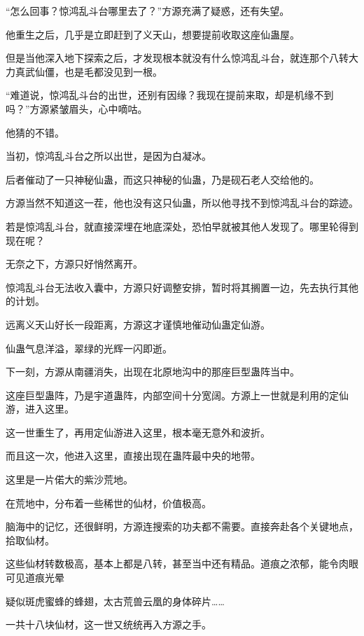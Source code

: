 
\begin{this_body}



“怎么回事？惊鸿乱斗台哪里去了？”方源充满了疑惑，还有失望。

他重生之后，几乎是立即赶到了义天山，想要提前收取这座仙蛊屋。

但是当他深入地下探索之后，才发现根本就没有什么惊鸿乱斗台，就连那个八转大力真武仙僵，也是毛都没见到一根。

“难道说，惊鸿乱斗台的出世，还别有因缘？我现在提前来取，却是机缘不到吗？”方源紧皱眉头，心中嘀咕。

他猜的不错。

当初，惊鸿乱斗台之所以出世，是因为白凝冰。

后者催动了一只神秘仙蛊，而这只神秘的仙蛊，乃是砚石老人交给他的。

方源当然不知道这一茬，他也没有这只仙蛊，所以他寻找不到惊鸿乱斗台的踪迹。

若是惊鸿乱斗台，就直接深埋在地底深处，恐怕早就被其他人发现了。哪里轮得到现在呢？

无奈之下，方源只好悄然离开。

惊鸿乱斗台无法收入囊中，方源只好调整安排，暂时将其搁置一边，先去执行其他的计划。

远离义天山好长一段距离，方源这才谨慎地催动仙蛊定仙游。

仙蛊气息洋溢，翠绿的光辉一闪即逝。

下一刻，方源从南疆消失，出现在北原地沟中的那座巨型蛊阵当中。

这座巨型蛊阵，乃是宇道蛊阵，内部空间十分宽阔。方源上一世就是利用的定仙游，进入这里。

这一世重生了，再用定仙游进入这里，根本毫无意外和波折。

而且这一次，他进入这里，直接出现在蛊阵最中央的地带。

这里是一片偌大的紫沙荒地。

在荒地中，分布着一些稀世的仙材，价值极高。

脑海中的记忆，还很鲜明，方源连搜索的功夫都不需要。直接奔赴各个关键地点，拾取仙材。

这些仙材转数极高，基本上都是八转，甚至当中还有精品。道痕之浓郁，能令肉眼可见道痕光晕

疑似斑虎蜜蜂的蜂翅，太古荒兽云凰的身体碎片……

一共十八块仙材，这一世又统统再入方源之手。


\end{this_body}
